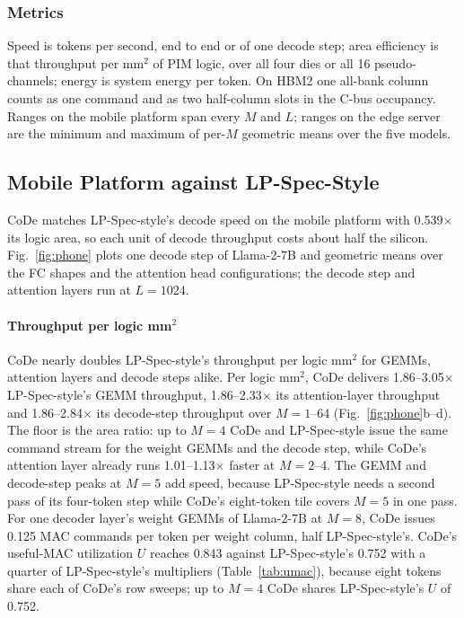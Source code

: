 \subsubsection{Metrics}
Speed is tokens per second, end to end or of one decode step; area efficiency is that throughput per mm$^2$ of PIM
logic, over all four dies or all 16 pseudo-channels; energy is system energy per token. On HBM2 one all-bank column counts as one command and as two half-column slots in the C-bus occupancy. Ranges on the mobile platform span every $M$ and $L$; ranges on the edge server are the minimum and maximum of per-$M$ geometric means over the five models.

\subsection{Mobile Platform against LP-Spec-Style}
\label{sec:eval:phone}

CoDe matches LP-Spec-style's decode speed on the mobile platform with 0.539$\times$ its logic area, so each unit of
decode throughput costs about half the silicon. Fig.~\ref{fig:phone} plots one decode step of Llama-2-7B and geometric
means over the FC shapes and the attention head configurations; the decode step and attention layers run at
$L = 1024$.

\paragraph{Throughput per logic mm$^2$}
CoDe nearly doubles LP-Spec-style's throughput per logic mm$^2$ for GEMMs, attention layers and decode steps alike. Per
logic mm$^2$, CoDe delivers 1.86--3.05$\times$ LP-Spec-style's GEMM throughput, 1.86--2.33$\times$ its
attention-layer throughput and 1.86--2.84$\times$ its decode-step throughput over $M = 1$--64
(Fig.~\ref{fig:phone}b--d). The floor is the area ratio: up to $M = 4$ CoDe and LP-Spec-style issue the same command stream for the weight
GEMMs and the decode step, while CoDe's attention layer already runs 1.01--1.13$\times$ faster at $M = 2$--4. The GEMM and decode-step peaks at $M = 5$ add speed, because LP-Spec-style needs a second pass of its four-token step
while CoDe's eight-token tile covers $M = 5$ in one pass. For one decoder layer's weight GEMMs of Llama-2-7B at
$M = 8$, CoDe issues 0.125 MAC commands per token per weight column, half LP-Spec-style's. CoDe's useful-MAC
utilization $U$ reaches 0.843 against LP-Spec-style's 0.752 with a quarter of LP-Spec-style's multipliers
(Table~\ref{tab:umac}), because eight tokens share each of CoDe's row sweeps; up to $M = 4$ CoDe shares
LP-Spec-style's $U$ of 0.752.

